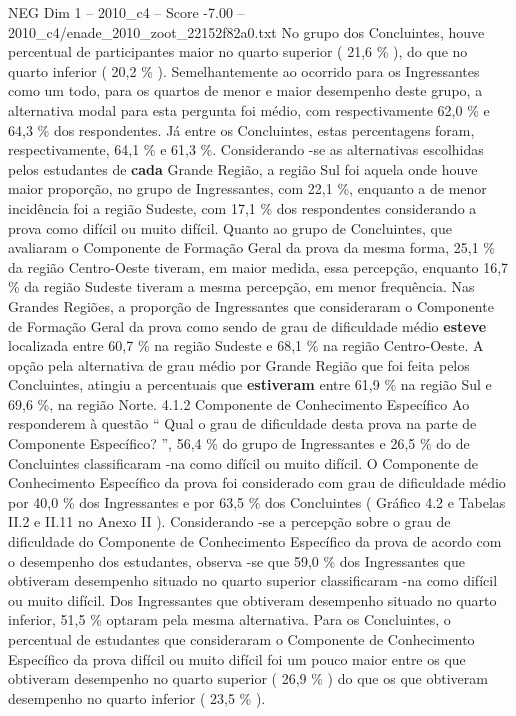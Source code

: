 \begin{textsample}{NEG Dim 1 – 2010\_c4 – Score -7.00 – 2010\_c4/enade\_2010\_zoot\_22152f82a0.txt}
No grupo dos Concluintes, houve percentual de participantes maior no quarto superior ( 21,6 \% ), do que no quarto inferior ( 20,2 \% ).
Semelhantemente ao ocorrido para os Ingressantes como um todo, para os quartos de menor e maior desempenho deste grupo, a alternativa modal para esta pergunta foi médio, com respectivamente 62,0 \% e 64,3 \% dos respondentes.
Já entre os Concluintes, estas percentagens foram, respectivamente, 64,1 \% e 61,3 \%.
Considerando -se as alternativas escolhidas pelos estudantes de \textbf{cada} Grande Região, a região Sul foi aquela onde houve maior proporção, no grupo de Ingressantes, com 22,1 \%, enquanto a de menor incidência foi a região Sudeste, com 17,1 \% dos respondentes considerando a prova como difícil ou muito difícil.
Quanto ao grupo de Concluintes, que avaliaram o Componente de Formação Geral da prova da mesma forma, 25,1 \% da região Centro-Oeste tiveram, em maior medida, essa percepção, enquanto 16,7 \% da região Sudeste tiveram a mesma percepção, em menor frequência.
Nas Grandes Regiões, a proporção de Ingressantes que consideraram o Componente de Formação Geral da prova como sendo de grau de dificuldade médio \textbf{esteve} localizada entre 60,7 \% na região Sudeste e 68,1 \% na região Centro-Oeste.
A opção pela alternativa de grau médio por Grande Região que foi feita pelos Concluintes, atingiu a percentuais que \textbf{estiveram} entre 61,9 \% na região Sul e 69,6 \%, na região Norte. 4.1.2 Componente de Conhecimento Específico Ao responderem à questão “ Qual o grau de dificuldade desta prova na parte de Componente Específico? ”, 56,4 \% do grupo de Ingressantes e 26,5 \% do de Concluintes classificaram -na como difícil ou muito difícil.
O Componente de Conhecimento Específico da prova foi considerado com grau de dificuldade médio por 40,0 \% dos Ingressantes e por 63,5 \% dos Concluintes ( Gráfico 4.2 e Tabelas II.2 e II.11 no Anexo II ).
Considerando -se a percepção sobre o grau de dificuldade do Componente de Conhecimento Específico da prova de acordo com o desempenho dos estudantes, observa -se que 59,0 \% dos Ingressantes que obtiveram desempenho situado no quarto superior classificaram -na como difícil ou muito difícil.
Dos Ingressantes que obtiveram desempenho situado no quarto inferior, 51,5 \% optaram pela mesma alternativa.
Para os Concluintes, o percentual de estudantes que consideraram o Componente de Conhecimento Específico da prova difícil ou muito difícil foi um pouco maior entre os que obtiveram desempenho no quarto superior ( 26,9 \% ) do que os que obtiveram desempenho no quarto inferior ( 23,5 \% ).

\end{textsample}
